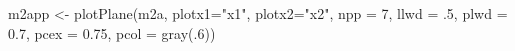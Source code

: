 \begin{Schunk}
\begin{Sinput}
 m2app <- plotPlane(m2a, plotx1="x1", plotx2="x2", npp = 7, llwd = .5, plwd = 0.7, pcex = 0.75, pcol = gray(.6))
\end{Sinput}
\end{Schunk}
